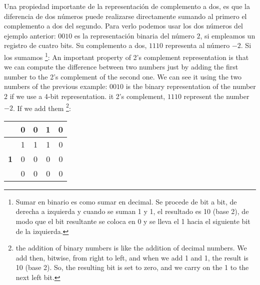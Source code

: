 \begin{paracol}{2}
 Una propiedad importante de la representación de complemento a dos, es que la diferencia de dos números puede realizarse directamente sumando al primero el complemento a dos del segundo. Para verlo podemos usar los dos números del ejemplo anterior: $0010$ es la representación binaria del número $2$, si empleamos un registro de cuatro bits. Su complemento a dos, $1110$ representa al número $-2$. Si los sumamos  \footnote{Sumar en binario es como sumar en decimal. Se procede de bit a bit, de derecha a izquierda y cuando se suman 1 y 1, el resultado es 10 (base 2), de modo que el bit resultante se coloca en 0 y se lleva el 1 hacia el siguiente bit de la izquierda.}:
\switchcolumn
{} An important property of 2's complement representation is that we can compute the difference between two numbers just by adding the first number to the 2's complement of the second one. We can see it using the two numbers of the previous example: $0010$ is the binary representation of the number $2$ if we use a 4-bit representation. it 2's complement, $1110$ represent the number $-2$. If we add them \footnote{the addition of binary numbers is like the addition of decimal numbers. We add then, bitwise, from right to left, and when we add 1 and 1, the result is 10 (base 2). So, the resulting bit is set to zero, and we carry on the 1 to the next left bit.}: 
\end{paracol}

\begin{table}[H]
 \centering
\begin{tabular}{|c|c|c|c|c|}
\hline
 &0&0&1&0\\
 \hline
  &1&1&1&0\\
  \hline
  \textbf{1}&0&0&0&0\\
  \hline
  \hline
  &0&0&0&0\\
  \hline
\end{tabular}
\end{table}

